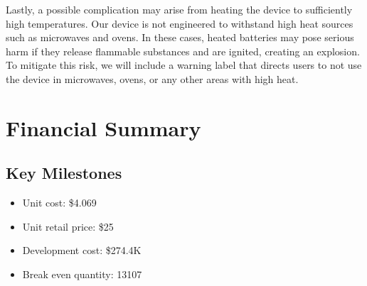 \documentclass[12pt]{article}
\begin{document}
	Lastly, a possible complication may arise from heating the device to sufficiently high temperatures. Our device is not engineered to withstand high heat sources such as microwaves and ovens. In these cases, heated batteries may pose serious harm if they release flammable substances and are ignited, creating an explosion. To mitigate this risk, we will include a warning label that directs users to not use the device in microwaves, ovens, or any other areas with high heat.
	
	
	
	
	\section*{Financial Summary}
	\subsection*{Key Milestones}
	\begin{itemize}
		\item 	Unit cost: \$4.069
		\item Unit retail price: \$25
		\item Development cost: \$274.4K
		\item Break even quantity: 13107
	\end{itemize}

	
\end{document}
